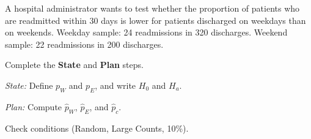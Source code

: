 \documentclass[10pt]{article}
\begin{document}
\namedateperiod

\vspace{0.15in}

A hospital administrator wants to test whether the proportion of patients who are readmitted
within 30 days is lower for patients discharged on weekdays than on weekends.
Weekday sample: 24 readmissions in 320 discharges.
Weekend sample: 22 readmissions in 200 discharges.

Complete the \textbf{State} and \textbf{Plan} steps.

\textit{State:} Define $p_W$ and $p_E$, and write $H_0$ and $H_a$.

\textit{Plan:} Compute $\hat p_W$, $\hat p_E$, and $\hat p_c$.

Check conditions (Random, Large Counts, 10\%).
\end{document}
